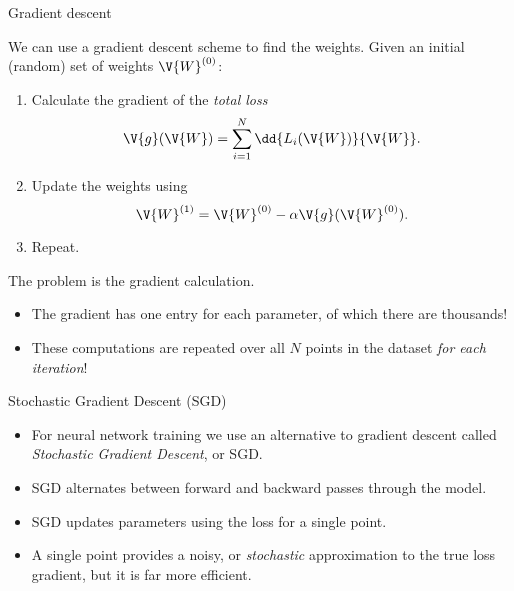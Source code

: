 \documentclass[9pt]{beamer}
\newcommand\VW{\V{W}}
\begin{document}
\begin{frame}{Gradient descent}

We can use a gradient descent scheme to find the weights. Given an initial (random) set of weights $\VW^{(0)}$:
\begin{enumerate}
	\item Calculate the gradient of the \emph{total loss}
		\[ \V{g}(\VW) = \sum_{i=1}^N \dd{L_i(\VW)}{\VW}. \]
	\item Update the weights using
		\[ \VW^{(1)} = \VW^{(0)} - \alpha \V{g}(\VW^{(0)}). \]
	\item Repeat.
\end{enumerate}

\bigskip
\pause
The problem is the gradient calculation. 
\begin{itemize}
	\item The gradient has one entry for each parameter, of which there are thousands!
	\item These computations are repeated over all $N$ points in the dataset \emph{for each iteration}!
\end{itemize}

\end{frame}

\begin{frame}{Stochastic Gradient Descent (SGD)}

\addtolength{\itemsep}{0.5\baselineskip}
\begin{itemize}
	\item For neural network training we use an alternative to gradient descent called \emph{Stochastic Gradient Descent}, or SGD.
	\item SGD alternates between forward and backward passes through the model.
	\item SGD updates parameters using the loss for a single point.
	\item A single point provides a noisy, or \emph{stochastic} approximation to the true loss gradient, but it is far more efficient.
\end{itemize}

\end{frame}
\end{document}
